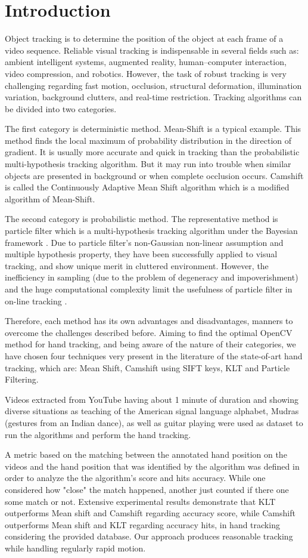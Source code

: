 \documentclass[a4paper]{article}
\begin{document}
\section{Introduction}
Object tracking is to determine the position of the object at each frame of a video sequence. Reliable visual tracking is indispensable in several fields such as: ambient intelligent systems, augmented reality, human–computer interaction, video compression, and robotics. However, the task of robust tracking is very challenging regarding fast motion, occlusion, structural deformation, illumination variation, background clutters, and real-time restriction. Tracking algorithms can be divided into two categories.
\par
The first category is deterministic method. Mean-Shift  is a typical example. This method finds the local maximum of probability distribution in the direction of gradient. It is usually more accurate and quick in tracking than the probabilistic multi-hypothesis tracking algorithm. But it may run into trouble when similar objects are presented in background or when complete occlusion occurs. Camshift is called the Continuously Adaptive Mean Shift algorithm which is a modified algorithm of Mean-Shift.
\par
The second category is probabilistic method. The representative method is particle filter which is a multi-hypothesis tracking algorithm under the Bayesian framework . Due to particle filter’s non-Gaussian non-linear assumption and multiple hypothesis property, they have been successfully applied to visual tracking, and show unique merit in cluttered environment. However, the inefficiency in sampling (due to the problem of degeneracy and impoverishment) and the huge computational complexity limit the usefulness of particle filter in on-line tracking \cite{Yin2011}.
\par
Therefore, each method has its own advantages and disadvantages, manners to overcome the challenges described before. Aiming to find the optimal OpenCV method for hand tracking, and being aware of the nature of their categories, we have chosen four techniques very present in the literature of the state-of-art hand tracking, which are: Mean Shift, Camshift using SIFT keys, KLT and Particle Filtering.
\par
Videos extracted from YouTube having about 1 minute of duration and showing diverse situations as teaching of the American signal language alphabet, Mudras (gestures from an Indian dance), as well as guitar playing  were used as dataset to run the algorithms and perform the hand tracking. 
\par
A metric based on the matching between the annotated hand position on the videos and the hand position that was identified by the algorithm was defined in order to analyze the the algorithm's score and hits accuracy. While one considered how "close" the match happened, another just counted if there one some match or not. Extensive experimental results demonstrate that KLT outperforms Mean shift and Camshift regarding accuracy score, while Camshift outperforms Mean shift and KLT regarding accuracy hits, in hand tracking considering the provided database. Our approach produces reasonable tracking while handling regularly rapid motion.
\end{document}
